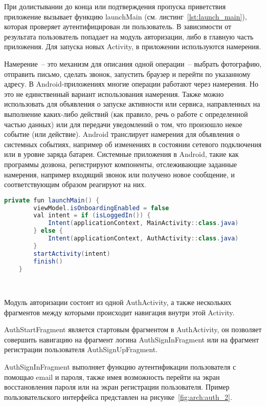При долистывании до конца или подтверждения пропуска приветствия приложение вызывает функцию launchMain (см. листинг~\ref{lst:launch_main}), которая проверяет аутентифицирован ли пользователь. В зависимости от результата пользователь попадает на модуль авторизации, либо в главную часть приложения. Для запуска новых Activity, в приложении используются намерения.

Намерение~-- это механизм для описания одной операции~-- выбрать фотографию, отправить письмо, сделать звонок, запустить браузер и перейти по указанному адресу. В Android-приложениях многие операции работают через намерения. Но это не единственный вариант использования намерения. Также можно использовать для объявления о запуске активности или сервиса, направленных на выполнение каких-либо действий (как правило, речь о работе с определенной частью данных) или для передачи уведомлений о том, что произошло некое событие (или действие). Android транслирует намерения для объявления о системных событиях, например об изменениях в состоянии сетевого подключения или в уровне заряда батареи. Системные приложения в Android, такие как программы дозвона, регистрируют компоненты, отслеживающие заданные намерения, например входящий звонок или получено новое сообщение, и соответствующим образом реагируют на них.

\begin{lstlisting}[language=Java,label={lst:launch_main},caption={Функция launchMain}]
    private fun launchMain() {
        viewModel.isOnboardingEnabled = false
        val intent = if (isLoggedIn()) {
            Intent(applicationContext, MainActivity::class.java)
        } else {
            Intent(applicationContext, AuthActivity::class.java)
        }
        startActivity(intent)
        finish()
    }
\end{lstlisting}


~\par

Модуль авторизации состоит из одной AuthActivity, а также нескольких фрагментов между которыми происходит навигация внутри этой Activity.

AuthStartFragment является стартовым фрагментом в AuthActivity, он позволяет совершить навигацию на фрагмент логина AuthSignInFragment или на фрагмент регистрации пользователя AuthSignUpFragment.

AuthSignInFragment выполняет функцию аутентификации пользователя с помощью email и пароля, также имея возможность перейти на экран восстановления пароля или на экран регистрации пользователя. Пример пользовательского интерфейса представлен на рисунке~\ref{fig:arch:auth_2}.

